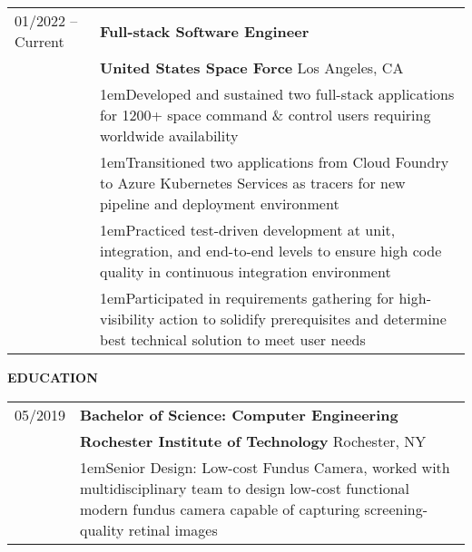 \documentclass[11pt]{article}
\newlength{\dateColumnWidth}
\newcommand{\customBulletLabel}{\raisebox{0.4ex}{\tiny$\bullet$}}
\newcommand{\detail}{\par\noindent\makebox[1em][l]{\customBulletLabel}\hangindent1em}
\begin{document}
\bigbreak
\begin{tabularx}{\textwidth}{@{}p{\dateColumnWidth}X@{}}
    01/2022 -- Current & \textbf{Full-stack Software Engineer}                                                                                                                        \\
                       & \textbf{United States Space Force} \textbar{} Los Angeles, CA                                                                                                \\
                       & \detail Developed and sustained two full-stack applications for 1200+ space command \& control users requiring worldwide availability                        \\
                       & \detail Transitioned two applications from Cloud Foundry to Azure Kubernetes Services as tracers for new pipeline and deployment environment                 \\
                       & \detail Practiced test-driven development at unit, integration, and end-to-end levels to ensure high code quality in continuous integration environment      \\
                       & \detail Participated in requirements gathering for high-visibility action to solidify prerequisites and determine best technical solution to meet user needs
\end{tabularx}
\bigbreak
{\Large \textbf{EDUCATION}}
\bigbreak
\begin{tabularx}{\textwidth}{@{}p{\dateColumnWidth}X@{}}
    05/2019 & \textbf{Bachelor of Science: Computer Engineering}                                                                                                                                         \\
            & \textbf{Rochester Institute of Technology} \textbar{} Rochester, NY                                                                                                                        \\
            & \detail Senior Design: Low-cost Fundus Camera, worked with multidisciplinary team to design low-cost functional modern fundus camera capable of capturing screening-quality retinal images \\
\end{tabularx}
\bigbreak
\end{document}

